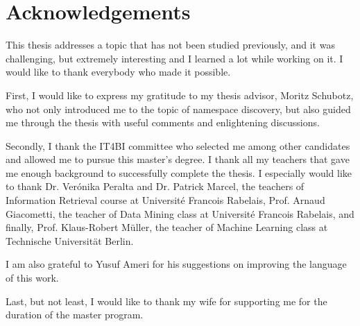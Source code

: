 \section*{Acknowledgements}

This thesis addresses a topic that has not been studied previously, and 
it was challenging, but extremely interesting and I learned a lot while working
on it. I would like to thank everybody who made it possible.

First, I would like to express my gratitude to my thesis advisor, Moritz Schubotz, who not 
only introduced me to the topic of namespace discovery, but also guided me through 
the thesis with  useful comments and enlightening discussions.

Secondly, I thank the IT4BI committee who selected me among other candidates 
and allowed me to pursue this master's degree. 
I thank all my teachers that gave me enough background to
successfully complete the thesis. I especially would like to thank
Dr. Ver\'onika Peralta  and Dr. Patrick Marcel, the teachers of 
Information Retrieval course at Universit\'e Francois Rabelais, 
Prof. Arnaud Giacometti, the teacher of Data Mining class at Universit\'e Francois Rabelais, 
and finally, Prof. Klaus-Robert M\"uller, the teacher of Machine Learning
class at Technische Universit\"at Berlin. 

I am also grateful to Yusuf Ameri for his suggestions on improving the language of this work.

Last, but not least, I would like to thank my wife for supporting me for the duration 
of the master program.
